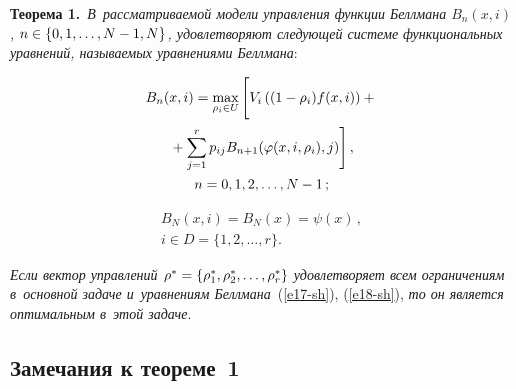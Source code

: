 \begin{multicols}{2}
     \smallskip
     
     \noindent
     \textbf{Теорема 1.}\ \textit{В~рассматриваемой модели управления функции 
Беллмана $B_n (x,i)$, $n\hm\in \{ 0,1,\ldots , N\hm-1, N\}$, удовлетворяют 
следующей системе функциональных уравнений, называемых уравнениями 
Беллмана}:

\noindent
     \begin{multline}
     B_n(x,i) =\max\limits_{\rho_i\in U} \Bigg[ 
     \vphantom{\sum\limits^r_{j=1}}
     V_i\left( (1-\rho_i)f(x,i)\right) + {}\\ %
  {}+
\sum\limits^r_{j=1} p_{ij} B_{n+1} (\varphi(x,i,\rho_i),j)\Bigg]\,,\\ %
     n=0,1,2,\ldots , N-1\,;
     \label{e17-sh}
     \end{multline}
     
     \vspace*{-12pt}
     
     \noindent
     \begin{multline}
     B_N(x,i) =B_N(x)=\psi(x)\,,\\ 
     i\in D=\{1,2,\ldots , r\}.
     \label{e18-sh}
     \end{multline}
     
     \textit{Если вектор управлений $\rho^*\hm= \left\{ \rho_1^*, \rho_2^*, \ldots , 
\rho_r^*\right\}$ удов\-ле\-тво\-ря\-ет всем ограничениям в~основной задаче 
и~уравнениям Беллмана}~(\ref{e17-sh}), (\ref{e18-sh}), \textit{то он является 
оптимальным в~этой задаче}.
     
     
     
     \subsection*{Замечания к теореме~1}
     

\end{multicols}

